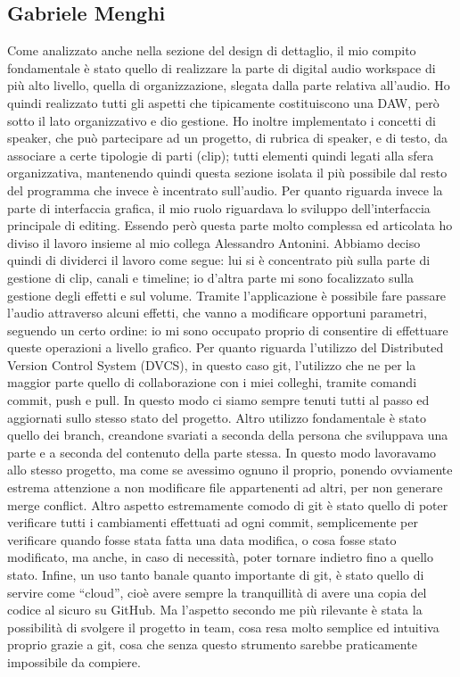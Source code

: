 \documentclass[a4paper,12pt]{report}
\begin{document}
\subsection{Gabriele Menghi}
Come analizzato anche nella sezione del design di dettaglio, il mio compito fondamentale è stato quello di realizzare la parte di digital audio workspace di più alto livello, quella di organizzazione, slegata dalla parte relativa all’audio. Ho quindi realizzato tutti gli aspetti che tipicamente costituiscono una DAW, però sotto il lato organizzativo e dio gestione. Ho inoltre implementato i concetti di speaker, che può partecipare ad un progetto, di rubrica di speaker, e di testo, da associare a certe tipologie di parti (clip); tutti elementi quindi legati alla sfera organizzativa, mantenendo quindi questa sezione isolata il più possibile dal resto del programma che invece è incentrato sull’audio.
Per quanto riguarda invece la parte di interfaccia grafica, il mio ruolo riguardava lo sviluppo dell’interfaccia principale di editing. Essendo però questa parte molto complessa ed articolata ho diviso il lavoro insieme al mio collega Alessandro Antonini. Abbiamo deciso quindi di dividerci il lavoro come segue: lui si è concentrato più sulla parte di gestione di clip, canali e timeline; io d’altra parte mi sono focalizzato sulla gestione degli effetti e sul volume. Tramite l’applicazione è possibile fare passare l’audio attraverso alcuni effetti, che vanno a modificare opportuni parametri, seguendo un certo ordine: io mi sono occupato proprio di consentire di effettuare queste operazioni a livello grafico.
Per quanto riguarda l’utilizzo del Distributed Version Control System (DVCS), in questo caso git, l’utilizzo che ne per la maggior parte quello di collaborazione con i miei colleghi, tramite comandi commit, push e pull. In questo modo ci siamo sempre tenuti tutti al passo ed aggiornati sullo stesso stato del progetto. Altro utilizzo fondamentale è stato quello dei branch, creandone svariati a seconda della persona che sviluppava una parte e a seconda del contenuto della parte stessa. In questo modo lavoravamo allo stesso progetto, ma come se avessimo ognuno il proprio, ponendo ovviamente estrema attenzione a non modificare file appartenenti ad altri, per non generare merge conflict. Altro aspetto estremamente comodo di git è stato quello di poter verificare tutti i cambiamenti effettuati ad ogni commit, semplicemente per verificare quando fosse stata fatta una data modifica, o cosa fosse stato modificato, ma anche, in caso di necessità, poter tornare indietro fino a quello stato. Infine, un uso tanto banale quanto importante di git, è stato quello di servire come “cloud”, cioè avere sempre la tranquillità di avere una copia del codice al sicuro su GitHub. Ma l’aspetto secondo me più rilevante è stata la possibilità di svolgere il progetto in team, cosa resa molto semplice ed intuitiva proprio grazie a git, cosa che senza questo strumento sarebbe praticamente impossibile da compiere.
\endsubsection
\end{document}
